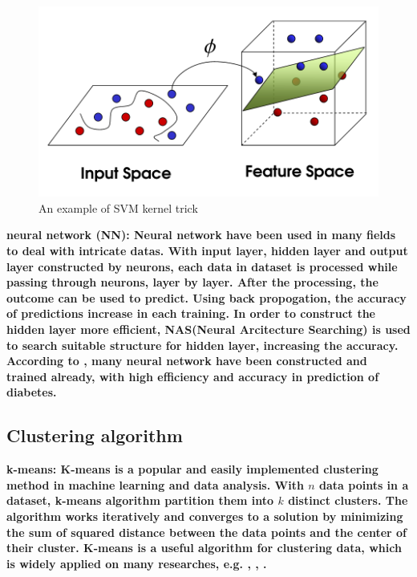 \documentclass[twocolumn,10pt]{article}
\begin{document}
\begin{figure}[htb]
    \centering
    \includegraphics[scale=0.25]{assets/SVM_kernel_trick.png}
    \caption{An example of SVM kernel trick}
    \label{fig:SVM_kernel_trick}
\end{figure}

\bf{neural network (NN)}: \rm{Neural} network have been used in many fields to deal with intricate datas. 
With input layer, hidden layer and output layer constructed by neurons, each data in dataset is processed 
while passing through neurons, layer by layer. After the processing, the outcome can be used to predict. 
Using back propogation, the accuracy of predictions increase in each training. In order to construct the 
hidden layer more efficient, NAS(Neural Arcitecture Searching) is used to search suitable structure for 
hidden layer, increasing the accuracy. According to \cite{Gadekallu2020}\cite{Beghriche2021}, many neural 
network have been constructed and trained already, with high efficiency and accuracy in prediction of 
diabetes.

\subsection*{Clustering algorithm}

\bf{k-means}: \rm{K-means} is a popular and easily implemented clustering method in machine learning and 
data analysis. With $n$ data points in a dataset, k-means algorithm partition them into $k$ distinct 
clusters. The algorithm works iteratively and converges to a solution by minimizing the sum of squared 
distance between the data points and the center of their cluster. K-means is a useful algorithm for 
clustering data, which is widely applied on many researches, e.g. \cite{oyelade2010application}, 
\cite{NIDHEESH2017213}, \cite{kadhm2018accurate}.
\end{document}
